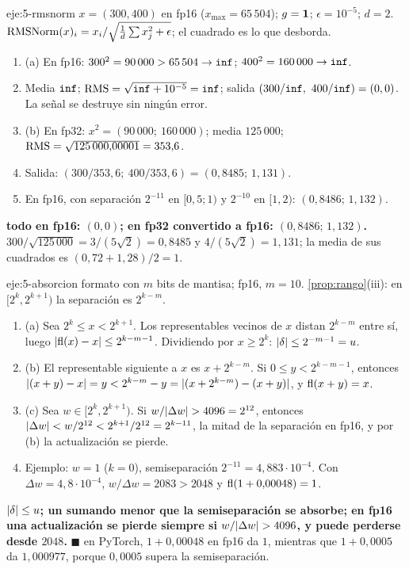 \begin{solucion}{eje:5-rmsnorm}
\datos $x=(300,400)$ en fp16 ($x_{\max}=65\,504$); $g=\mathbf{1}$; $\epsilon=10^{-5}$; $d=2$.
\planteamiento $\operatorname{RMSNorm}(x)_i=x_i/\sqrt{\frac1d\sum x_j^{2}+\epsilon}$; el cuadrado es lo que desborda.
\pasos
\begin{enumerate}[label=\arabic*.]
  \item (a) En fp16: $300^{2}=90\,000>65\,504\to\Inf$; $400^{2}=160\,000\to\Inf$.
  \item Media $\Inf$; $\RMS=\sqrt{\Inf+10^{-5}}=\Inf$; salida $(300/\Inf,\ 400/\Inf)=(0,0)$. La señal se destruye sin ningún error.
  \item (b) En fp32: $x^{2}=(90\,000;\ 160\,000)$; media $125\,000$; $\operatorname{RMS}=\sqrt{125\,000{,}00001}=353{,}6$.
  \item Salida: $(300/353{,}6;\ 400/353{,}6)=(0{,}8485;\,1{,}131)$.
  \item En fp16, con separación $2^{-11}$ en $[0{,}5;1)$ y $2^{-10}$ en $[1,2)$: $(0{,}8486;\,1{,}132)$.
\end{enumerate}
\resultado \textbf{todo en fp16: $(0,0)$; en fp32 convertido a fp16: $(0{,}8486;\,1{,}132)$.}
\comprobacion $300/\sqrt{125\,000}=3/(5\sqrt2)=0{,}8485$ y $4/(5\sqrt2)=1{,}131$; la media de sus cuadrados es $(0{,}72+1{,}28)/2=1$.
\end{solucion}

\begin{solucion}{eje:5-absorcion}
\datos formato con $m$ bits de mantisa; fp16, $m=10$.
\planteamiento \cref{prop:rango}(iii): en $[2^{k},2^{k+1})$ la separación es $2^{k-m}$.
\pasos
\begin{enumerate}[label=\arabic*.]
  \item (a) Sea $2^{k}\le x<2^{k+1}$. Los representables vecinos de $x$ distan $2^{k-m}$ entre sí, luego $\lvert\operatorname{fl}(x)-x\rvert\le 2^{k-m-1}$. Dividiendo por $x\ge 2^{k}$: $\lvert\delta\rvert\le 2^{-m-1}=u$.
  \item (b) El representable siguiente a $x$ es $x+2^{k-m}$. Si $0\le y<2^{k-m-1}$, entonces $\lvert(x+y)-x\rvert=y<2^{k-m}-y=\lvert(x+2^{k-m})-(x+y)\rvert$, y $\operatorname{fl}(x+y)=x$.
  \item (c) Sea $w\in[2^{k},2^{k+1})$. Si $w/\lvert\Delta w\rvert>4096=2^{12}$, entonces $\lvert\Delta w\rvert<w/2^{12}<2^{k+1}/2^{12}=2^{k-11}$, la mitad de la separación en fp16, y por (b) la actualización se pierde.
  \item Ejemplo: $w=1$ ($k=0$), semiseparación $2^{-11}=4{,}883\cdot 10^{-4}$. Con $\Delta w=4{,}8\cdot 10^{-4}$, $w/\Delta w=2083>2048$ y $\operatorname{fl}(1+0{,}00048)=1$.
\end{enumerate}
\resultado \textbf{$\lvert\delta\rvert\le u$; un sumando menor que la semiseparación se absorbe; en fp16 una actualización se pierde siempre si $w/\lvert\Delta w\rvert>4096$, y puede perderse desde $2048$.} $\blacksquare$
\comprobacion en PyTorch, $1+0{,}00048$ en fp16 da $1$, mientras que $1+0{,}0005$ da $1{,}000977$, porque $0{,}0005$ supera la semiseparación.
\end{solucion}

